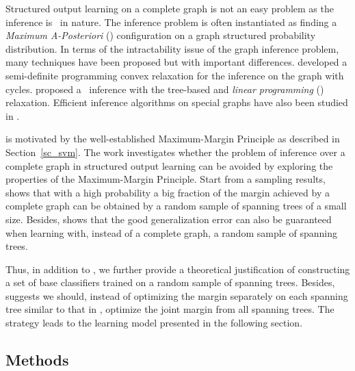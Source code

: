 {Structured output learning on a complete graph is not an easy problem as the inference is \nphard\ in nature.
The inference problem is often instantiated as finding a \textit{Maximum A-Posteriori} (\map) configuration on a graph structured probability distribution.
In terms of the intractability issue of the graph inference problem, many techniques have been proposed but with important differences.
\citet{Jordan04semiefinite} developed a semi-definite programming convex relaxation for the inference on the graph with cycles.
\citet{Wainwright05map} proposed a \map\ inference with the tree-based and \textit{linear programming} (\lp) relaxation.
Efficient inference algorithms on special graphs have also been studied in \citep{Globerson07approximate}.

 is motivated by the well-established Maximum-Margin Principle as described in Section~\ref{sc_svm}.
The work investigates whether the problem of inference over a complete graph in structured output learning can be avoided by exploring the properties of the Maximum-Margin Principle.
Start from a sampling results,  shows that with a high probability a big fraction of the margin achieved by a complete graph can be obtained by a random sample of spanning trees of a small size.
Besides,  shows that the good generalization error can also be guaranteed when learning with, instead of a complete graph, a random sample of spanning trees.

Thus, in addition to , we further provide a theoretical justification of constructing a set of base classifiers trained on a random sample of spanning trees. 
Besides,  suggests we should, instead of optimizing the margin separately on each spanning tree similar to that in \mam, optimize the joint margin from all spanning trees.
The strategy leads to the learning model presented in the following section.

\subsection{Methods}

}
